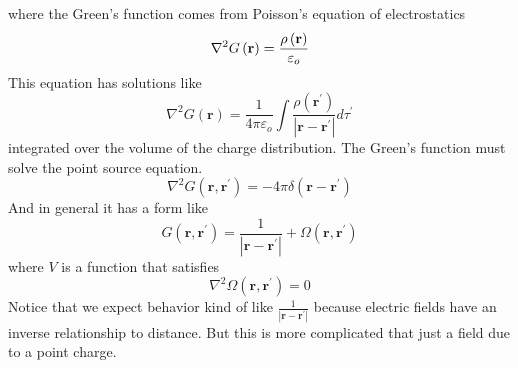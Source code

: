 \documentclass{article}
\begin{document}
where the Green's function comes from Poisson's equation of electrostatics%
\begin{equation*}
\nabla ^{2}G\left( \mathbf{r}\right) =\frac{\rho \left( \mathbf{r}\right) }{%
\varepsilon _{o}}
\end{equation*}%
This equation has solutions like 
\begin{equation*}
\nabla ^{2}G\left( \mathbf{r}\right) =\frac{1}{4\pi \varepsilon _{o}}\int 
\frac{\rho \left( \mathbf{r}^{\prime }\right) }{\left\vert \mathbf{r}-%
\mathbf{r}^{\prime }\right\vert }d\tau ^{\prime }
\end{equation*}%
integrated over the volume of the charge distribution. The Green's function
must solve the point source equation.   
\begin{equation*}
\nabla ^{2}G\left( \mathbf{r},\mathbf{r}^{\prime }\right) =-4\pi \delta
\left( \mathbf{r}-\mathbf{r}^{\prime }\right) 
\end{equation*}%
And in general it has a form like 
\begin{equation*}
G\left( \mathbf{r},\mathbf{r}^{\prime }\right) =\frac{1}{\left\vert \mathbf{r%
}-\mathbf{r}^{\prime }\right\vert }+\Omega \left( \mathbf{r},\mathbf{r}%
^{\prime }\right) 
\end{equation*}%
where $V$ is a function that satisfies 
\begin{equation*}
\nabla ^{2}\Omega \left( \mathbf{r},\mathbf{r}^{\prime }\right) =0
\end{equation*}%
Notice that we expect behavior kind of like $\frac{1}{\left\vert \mathbf{r}-%
\mathbf{r}^{\prime }\right\vert }$ because electric fields have an inverse
relationship to distance. But this is more complicated that just a field due
to a point charge.
\end{document}

